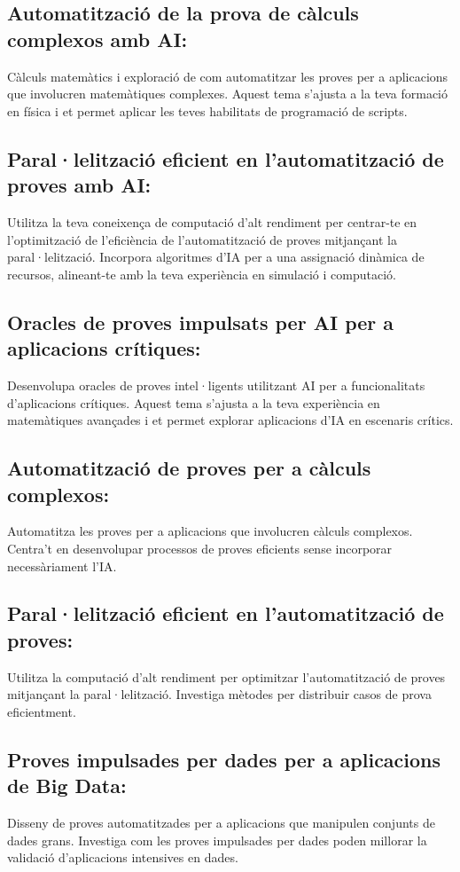 \documentclass[a4paper, 12pt, left=1.5cm, right=1.5cm, top=1.5cm, bottom=1.5cm]{article}
\begin{document}
\subsection{Automatització de la prova de càlculs complexos amb AI:}
Càlculs matemàtics i exploració de com automatitzar les proves per a aplicacions que involucren matemàtiques complexes.
Aquest tema s'ajusta a la teva formació en física i et permet aplicar les teves habilitats de programació de scripts.

\subsection{Paral·lelització eficient en l'automatització de proves amb AI:}
Utilitza la teva coneixença de computació d'alt rendiment per centrar-te en l'optimització de l'eficiència de l'automatització de proves mitjançant la paral·lelització.
Incorpora algoritmes d'IA per a una assignació dinàmica de recursos, alineant-te amb la teva experiència en simulació i computació.

\subsection{Oracles de proves impulsats per AI per a aplicacions crítiques:}
Desenvolupa oracles de proves intel·ligents utilitzant AI per a funcionalitats d'aplicacions crítiques.
Aquest tema s'ajusta a la teva experiència en matemàtiques avançades i et permet explorar aplicacions d'IA en escenaris crítics.

\subsection{Automatització de proves per a càlculs complexos:}
Automatitza les proves per a aplicacions que involucren càlculs complexos.
Centra't en desenvolupar processos de proves eficients sense incorporar necessàriament l'IA.

\subsection{Paral·lelització eficient en l'automatització de proves:}
Utilitza la computació d'alt rendiment per optimitzar l'automatització de proves mitjançant la paral·lelització.
Investiga mètodes per distribuir casos de prova eficientment.

\subsection{Proves impulsades per dades per a aplicacions de Big Data:}
Disseny de proves automatitzades per a aplicacions que manipulen conjunts de dades grans.
Investiga com les proves impulsades per dades poden millorar la validació d'aplicacions intensives en dades.
\end{document}
